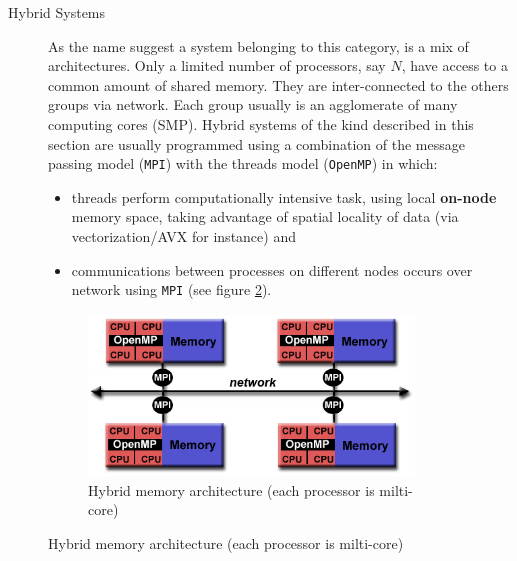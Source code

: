 \begin{description}
\begin{description}
	\item[Hybrid Systems] As the name suggest a system belonging to this category, is a mix of architectures. Only a limited number of  processors, say $N$, have access to a common amount of shared memory. They are  inter-connected to the others groups via network. Each group  usually is an agglomerate of many computing cores (SMP).
		Hybrid systems of the kind described in this section are usually programmed using a combination of the message passing model (\texttt{MPI}) with the threads model (\texttt{OpenMP}) in which:
		\begin{itemize}
			\item threads perform computationally intensive task, using local
			\textbf{on-node} memory space, taking advantage of spatial locality of data (via vectorization/AVX for instance) and 
			\item communications between processes on different nodes occurs over network using \texttt{MPI} (see figure \ref{fig:hybridMemory}).
	\end{itemize} 
\end{description}
 
 \begin{figure}
 	\centering
 	\begin{subfigure}{0.55\textwidth}
 		\centering
 			\caption{Hybrid memory architecture (each processor is milti-core)}
 		\label{fig:hybridMemory}
 		\includegraphics[width=0.95\textwidth]{./images/parallel_programming/hybrid_model}
 	

\end{subfigure}
\end{figure}
\end{description}
